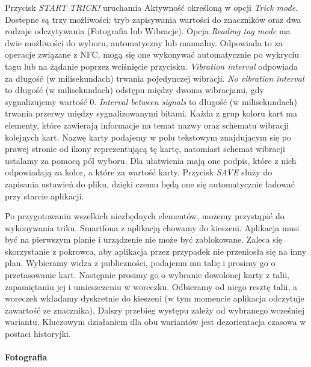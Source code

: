 \documentclass{article}
\numberwithin{equation}{section}
\begin{document}
Przycisk \textit{START TRICK!} uruchamia Aktywność określoną w opcji \textit{Trick mode}. Dostepne są trzy możliwości: tryb zapisywania wartości do znaczników oraz dwa rodzaje odczytywania (Fotografia lub Wibracje). Opcja \textit{Reading tag mode} ma dwie możliwości do wyboru, automatyczny lub manualny. Odpowiada to za operacje związane z NFC, mogą się one wykonywać automatycznie po wykryciu tagu lub na żądanie poprzez wciśnięcie przycisku. \textit{Vibration interval} odpowiada za długość (w milisekundach) trwania pojedynczej wibracji. \textit{No vibration interval} to długość (w milisekundach) odstępu między dwoma wibracjami, gdy sygnalizujemy wartość 0. \textit{Interval between signals} to długość (w milisekundach) trwania przerwy między sygnalizowanymi bitami. Każda z grup koloru kart ma elementy, które zawierają informacje na temat nazwy oraz schematu wibracji kolejnych kart. Nazwę karty podajemy w polu tekstowym znajdującym się po prawej stronie od ikony reprezentującą tę kartę, natomiast schemat wibracji ustalamy za pomocą pól wyboru. Dla ułatwienia mają one podpis, które z nich odpowiadają za kolor, a które za wartość karty. Przycisk \textit{SAVE} służy do zapisania ustawień do pliku, dzięki czemu będą one się automatycznie ładować przy starcie aplikacji. 
\par
Po przygotowaniu wszelkich niezbędnych elementów, możemy przystąpić do wykonywania triku. Smartfona z aplikacją chowamy do kieszeni. Aplikacja musi być na pierwszym planie i urządzenie nie może być zablokowane. Zaleca się skorzystanie z pokrowca, aby aplikacja przez przypadek nie przeniosła się na inny plan. Wybieramy widza z publiczności, podajemu mu talię i prosimy go o przetasowanie kart. Następnie prosimy go o wybranie dowolonej karty z talii, zapamiętaniu jej i umieszczeniu w woreczku. Odbieramy od niego resztę talii, a woreczek wkładamy dyskretnie do kieszeni (w tym momencie aplikacja odczytuje zawartość ze znacznika). Dalszy przebieg występu zależy od wybranego wcześniej wariantu. Kluczowym działaniem dla obu wariantów jest dezorientacja czasowa w postaci historyjki.
\paragraph{Fotografia}\mbox{}\\
\end{document}
